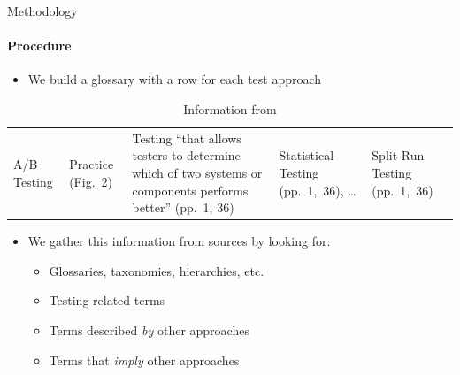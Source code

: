 \begin{frame}{Methodology}
    \framesubtitle{Procedure}
    \begin{itemize}
        \item We build a glossary with a row for each test approach
    \end{itemize}
    \begin{center}
        \begin{table}
            \small
            \begin{tabularx}{\linewidth}{|M{1.1cm}|M{1.3cm}|X|M{1.5cm}|M{1.6cm}|}
                \hline
                 &  &                                                                                          &                        &            \\
                \hline
                A/B Testing           & Practice {\tiny (Fig.~2)} & Testing ``that allows testers to determine which of two systems or components performs better'' {\tiny (pp.~1, 36)} & Statistical Testing {\tiny (pp.~1,~36)}, \dots{} & Split-Run Testing {\tiny (pp.~1,~36)} \\
                \hline
            \end{tabularx}
            \caption{\tiny Information from \citep{IEEE2022}}
        \end{table}
    \end{center}
    \pause \vspace{-0.5cm}
    \begin{itemize}
        \item We gather this information from sources by looking for:
              \begin{itemize}
                  \item Glossaries, taxonomies, hierarchies, etc.
                  \item Testing-related terms
                  \item Terms described \emph{by} other approaches
                  \item Terms that \emph{imply} other approaches
              \end{itemize}
    \end{itemize}
\end{frame}


